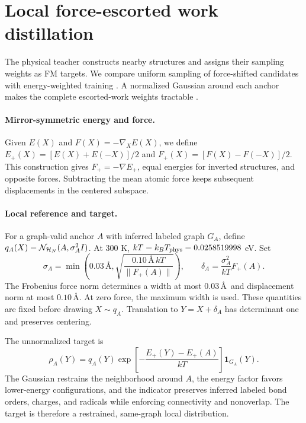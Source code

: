 \section{Local force-escorted work distillation}\label{app:local-work}
The physical teacher constructs nearby structures and assigns their sampling weights as FM targets. We compare uniform sampling of force-shifted candidates with energy-weighted training \citep{dern2025energyweighted,fab}. A normalized Gaussian around each anchor makes the complete escorted-work weights tractable \citep{escorted2008}.

\paragraph{Mirror-symmetric energy and force.}
Given $E(X)$ and $F(X)=-\nabla_X E(X)$, we define $E_+(X)=[E(X)+E(-X)]/2$ and $F_+(X)=[F(X)-F(-X)]/2$. This construction gives $F_+=-\nabla E_+$, equal energies for inverted structures, and opposite forces. Subtracting the mean atomic force keeps subsequent displacements in the centered subspace.

\paragraph{Local reference and target.}
For a graph-valid anchor $A$ with inferred labeled graph $G_A$, define $q_A(X)=\mathcal N_{\mathcal H_N}(A,\sigma_A^2I)$. At 300 K, $kT=k_B T_{\rm phys}=0.0258519998$ eV. Set
\begin{equation}
 \sigma_A=\min\left(0.03\,\text{\AA},
 \sqrt{\frac{0.10\,\text{\AA}\,kT}{\|F_+(A)\|}}\right),\qquad
 \delta_A=\frac{\sigma_A^2}{kT}F_+(A).
\end{equation}
The Frobenius force norm determines a width at most $0.03$\,\AA\ and displacement norm at most $0.10$\,\AA. At zero force, the maximum width is used. These quantities are fixed before drawing $X\sim q_A$. Translation to $Y=X+\delta_A$ has determinant one and preserves centering.

The unnormalized target is
\begin{equation}
 \rho_A(Y)=q_A(Y)\exp\!\left[-\frac{E_+(Y)-E_+(A)}{kT}\right]
 \mathbf1_{G_A}(Y).
\end{equation}
The Gaussian restrains the neighborhood around $A$, the energy factor favors lower-energy configurations, and the indicator preserves inferred labeled bond orders, charges, and radicals while enforcing connectivity and nonoverlap. The target is therefore a restrained, same-graph local distribution.

